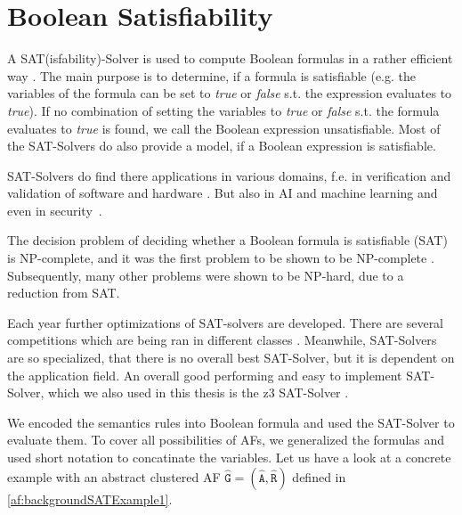 \section{Boolean Satisfiability}
\label{sec:BooleanSatisfiability}

A SAT(isfability)-Solver is used to compute Boolean formulas in a rather efficient way \cite{Biere2009}. The main purpose is to determine, if a formula is satisfiable (e.g. the variables of the formula can be set to \textit{true} or \textit{false} s.t. the expression evaluates to \textit{true}). If no combination of setting the variables to \textit{true} or \textit{false} s.t. the formula evaluates to \textit{true} is found, we call the Boolean expression unsatisfiable. Most of the SAT-Solvers do also provide a model, if a Boolean expression is satisfiable.

SAT-Solvers do find there applications in various domains, f.e. in verification and validation of software and hardware \cite{DBLP:conf/dagstuhl/Gogolla09, DBLP:books/daglib/0045943}. But also in AI and machine learning \cite{DBLP:phd/basesearch/Liang18a} and even in security~\cite{Pasero2022-SATHashFunctions-Repo, DBLP:journals/iacr/LinYXTS24}.

The decision problem of deciding whether a Boolean formula is satisfiable (SAT) is NP-complete, and it was the first problem to be shown to be NP-complete \cite{Cook71}. Subsequently, many other problems were shown to be NP-hard, due to a reduction from SAT.


Each year further optimizations of SAT-solvers are developed. There are several competitions which are being ran in different classes \cite{SAT-Solver-Competition}. Meanwhile, SAT-Solvers are so specialized, that there is no overall best SAT-Solver, but it is dependent on the application field. An overall good performing and easy to implement SAT-Solver, which we also used in this thesis is the z3 SAT-Solver \cite{z3-SAT-Solver}.


We encoded the semantics rules into Boolean formula and used the SAT-Solver to evaluate them. To cover all possibilities of AFs, we generalized the formulas and used short notation to concatinate the variables. Let us have a look at a concrete example with an abstract clustered AF $\mathtt{\hat{G}=(\hat{A}, \hat{R})}$ defined in \cref{af:backgroundSATExample1}.



